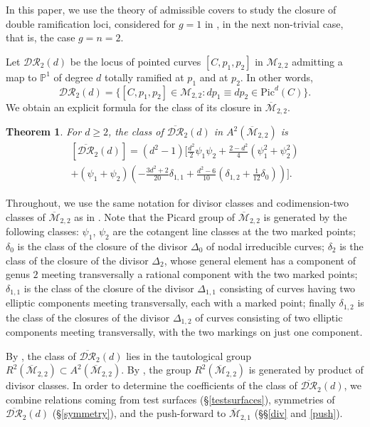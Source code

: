 \documentclass[10pt]{amsart}
\newtheorem{thm}{Theorem}[section]
\theoremstyle{definition}
\begin{document}
In this paper, we use the theory of admissible covers to study the closure of double ramification loci, considered for $g=1$ in \cite{MR3231020}, in the next non-trivial case, that is, the case $g=n=2$.

Let ${\mathcal{DR}}_2(d)$ be the locus of pointed curves $[C,p_1,p_2]$ in ${\mathcal{M}}_{2,2}$ admitting a map to $\mathbb{P}^1$ of degree $d$ totally ramified at $p_1$ and at $p_2$. In other words,
\[
{\mathcal{DR}}_2(d) = \{[C,p_1,p_2]\in{\mathcal{M}}_{2,2} :  dp_1\equiv dp_2 \in\textrm{Pic}^d(C)\}.
\]
We obtain an explicit formula for the class of its closure in ${\overline{\mathcal{M}}}_{2,2}$.

\begin{thm}
\label{ACC}
For $d\geq 2$, the class of $\overline{\mathcal{DR}}_2(d)$ in $A^2({\overline{\mathcal{M}}}_{2,2})$ is
\begin{multline*}
\left[\overline{\mathcal{DR}}_2(d)\right] = (d^2-1)\Bigg[
\frac{d^2}{2}\psi_1\psi_2 +\frac{2-d^2}{4} \left(\psi_1^2+\psi_2^2\right)\\
+\left(\psi_1+\psi_2\right)\left(-\frac{3d^2+2}{20} \delta_{1,1}
+\frac{d^2-6}{10}\left(\delta_{1,2}+\frac{1}{12}\delta_0 \right)\right)
\Bigg].
\end{multline*}
\end{thm}
\noindent Throughout, we use the same notation for divisor classes and codimension-two classes of ${\overline{\mathcal{M}}}_{2,2}$ as in \cite{MR1672112}. Note that the Picard group of ${\overline{\mathcal{M}}}_{2,2}$ is generated by the following classes: $\psi_1$, $\psi_2$ are the cotangent line classes at the two marked points; $\delta_0$ is the class of the closure of the divisor $\Delta_0$ of nodal irreducible curves; $\delta_2$ is the class of the closure of the divisor $\Delta_2$, whose general element has a component of genus $2$ meeting transversally a rational component with the two marked points; $\delta_{1,1}$ is the class of the closure of the divisor $\Delta_{1,1}$ consisting of curves having two elliptic components meeting transversally, each with a marked point; finally $\delta_{1,2}$ is the class of the closures of the divisor $\Delta_{1,2}$ of  curves consisting of two elliptic components meeting transversally, with the two markings on just one component.

By \cite{MR2120989}, the class of $\overline{\mathcal{DR}}_2(d)$ lies in the tautological group $R^2({\overline{\mathcal{M}}}_{2,2})\subset A^2({\overline{\mathcal{M}}}_{2,2})$. By \cite{MR1672112}, the group $R^2({\overline{\mathcal{M}}}_{2,2})$ is generated by product of divisor classes. In order to determine the coefficients of the class of $\overline{\mathcal{DR}}_2(d)$, we combine relations coming from test surfaces (\S \ref{testsurfaces}), symmetries of $\overline{\mathcal{DR}}_2(d)$ (\S \ref{symmetry}), and the push-forward to ${\overline{\mathcal{M}}}_{2,1}$ (\S\S \ref{div} and \ref{push}).
\end{document}

